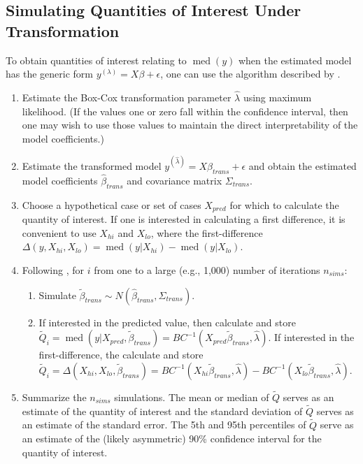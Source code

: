 \documentclass[12pt]{article}
\DeclareMathOperator{\med}{med}
\begin{document}
\subsection*{Simulating Quantities of Interest Under Transformation}

To obtain quantities of interest relating to $\med(y)$ when the estimated model has the generic form $y^{(\lambda)} = X\beta + \epsilon$, one can use the algorithm described by \cite{KingTomzWittenberg2000}.
\begin{enumerate}
\item Estimate the Box-Cox transformation parameter $\hat{\lambda}$ using maximum likelihood. 
(If the values one or zero fall within the confidence interval, then one may wish to use those values to maintain the direct interpretability of the model coefficients.)
\item Estimate the transformed model $y^{(\hat{\lambda})} = X\beta_{trans} + \epsilon$ and obtain the estimated model coefficients $\hat{\beta}_{trans}$ and covariance matrix $\Sigma_{trans}$.
\item Choose a hypothetical case or set of cases $X_{pred}$ for which to calculate the quantity of interest. 
If one is interested in calculating a first difference, it is convenient to use $X_{hi}$ and $X_{lo}$, where the first-difference $\Delta(y, X_{hi}, X_{lo}) = \med(y | X_{hi}) - \med(y | X_{lo})$.
\item Following \cite{KingTomzWittenberg2000}, for $i$ from one to a large (e.g., 1,000) number of iterations $n_{sims}$:
        \begin{enumerate}
        \item Simulate $\tilde{\beta}_{trans} \sim N\left(\hat{\beta}_{trans}, \Sigma_{trans}\right)$.
        \item If interested in the predicted value, then calculate and store $\tilde{Q}_i = \med(y | X_{pred}, \tilde{\beta}_{trans}) = BC^{-1}(X_{pred}\tilde{\beta}_{trans}, \hat{\lambda})$. If interested in the first-difference, the calculate and store $\tilde{Q}_i = \Delta(X_{hi}, X_{lo}, \tilde{\beta}_{trans}) = BC^{-1}(X_{hi}\tilde{\beta}_{trans}, \hat{\lambda}) - BC^{-1}(X_{lo}\tilde{\beta}_{trans}, \hat{\lambda})$.
        \end{enumerate}
\item Summarize the $n_{sims}$ simulations. 
The mean or median of $\tilde{Q}$ serves as an estimate of the quantity of interest and the standard deviation of $\tilde{Q}$ serves as an estimate of the standard error. The 5th and 95th percentiles of $\tilde{Q}$ serve as an estimate of the (likely asymmetric) 90\% confidence interval for the quantity of interest.
\end{enumerate}
\end{document}
